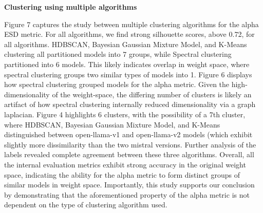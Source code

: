\textbf{Clustering using multiple algorithms}
\begin{table}[h]
\centering
\caption{Clustering Comparison (Alpha).}
\label{tab:clustering_comparison_alpha}
\end{table}

Figure 7 captures the study between multiple clustering algorithms for the alpha ESD metric. For all algorithms, we find strong silhouette scores, above 0.72, for all algorithms. HDBSCAN, Bayesian Gaussian Mixture Model, and K-Means clustering all partitioned models into 7 groups, while Spectral clustering partitioned into 6 models. This likely indicates overlap in weight space, where spectral clustering groups two similar types of models into 1. Figure 6 displays how spectral clustering grouped models for the alpha metric. Given the high-dimensionality of the weight-space, the differing number of clusters is likely an artifact of how spectral clustering internally reduced dimensionality via a graph laplacian. Figure 4 highlights 6 clusters, with the possibility of a 7th cluster, where HDBSCAN, Bayesian Gaussian Mixture Model, and K-Means distinguished between open-llama-v1 and open-llama-v2 models (which exhibit slightly more dissimilarity than the two mistral versions. Further analysis of the labels revealed complete agreement between these three algorithms. Overall, all the internal evaluation metrics exhibit strong accuracy in the original weight space, indicating the ability for the alpha metric to form distinct groups of similar models in weight space. Importantly, this study supports our conclusion by demonstrating that the aforementioned property of the alpha metric is not dependent on the type of clustering algorithm used.


